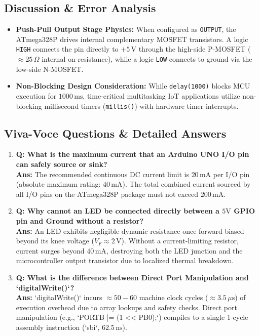 \documentclass[11pt,a4paper]{article}
\begin{document}
\subsection{Discussion \& Error Analysis}
\begin{itemize}[noitemsep]
    \item \textbf{Push-Pull Output Stage Physics:} When configured as \texttt{OUTPUT}, the ATmega328P drives internal complementary MOSFET transistors. A logic \texttt{HIGH} connects the pin directly to $+5\,\text{V}$ through the high-side P-MOSFET ($\approx 25\,\Omega$ internal on-resistance), while a logic \texttt{LOW} connects to ground via the low-side N-MOSFET.
    \item \textbf{Non-Blocking Design Consideration:} While \texttt{delay(1000)} blocks MCU execution for $1000\,\text{ms}$, time-critical multitasking IoT applications utilize non-blocking millisecond timers (\texttt{millis()}) with hardware timer interrupts.
\end{itemize}

\subsection{Viva-Voce Questions \& Detailed Answers}
\begin{enumerate}[leftmargin=*]
    \item \textbf{Q: What is the maximum current that an Arduino UNO I/O pin can safely source or sink?}\\
    \textbf{Ans:} The recommended continuous DC current limit is $20\,\text{mA}$ per I/O pin (absolute maximum rating: $40\,\text{mA}$). The total combined current sourced by all I/O pins on the ATmega328P package must not exceed $200\,\text{mA}$.
    \item \textbf{Q: Why cannot an LED be connected directly between a $5\text{V}$ GPIO pin and Ground without a resistor?}\\
    \textbf{Ans:} An LED exhibits negligible dynamic resistance once forward-biased beyond its knee voltage ($V_F \approx 2\,\text{V}$). Without a current-limiting resistor, current surges beyond $40\,\text{mA}$, destroying both the LED junction and the microcontroller output transistor due to localized thermal breakdown.
    \item \textbf{Q: What is the difference between Direct Port Manipulation and `digitalWrite()`?}\\
    \textbf{Ans:} `digitalWrite()` incurs $\approx 50-60$ machine clock cycles ($\approx 3.5\,\mu\text{s}$) of execution overhead due to array lookups and safety checks. Direct port manipulation (e.g., `PORTB |= (1 << PB0);`) compiles to a single 1-cycle assembly instruction (`sbi`, $62.5\,\text{ns}$).
\end{enumerate}
\end{document}
